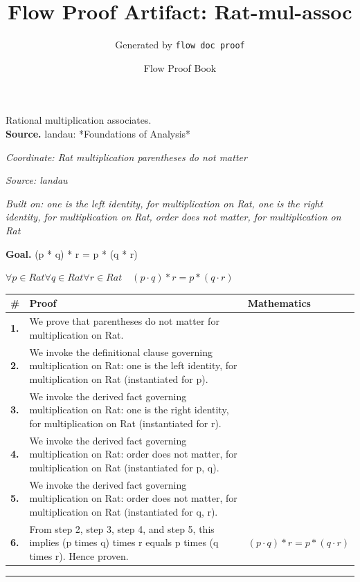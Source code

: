 \documentclass[11pt]{article}
\title{Flow Proof Artifact: Rat-mul-assoc}
\author{Generated by \texttt{flow doc proof}}
\date{Flow Proof Book}
\theoremstyle{definition}
\begin{document}
\maketitle
Rational multiplication associates.\\[0.5em]
\textbf{Source.} landau: *Foundations of Analysis*\\[0.5em]
\bigskip
{}\par
\smallskip\noindent\textit{Coordinate: Rat \cdot multiplication \cdot parentheses do not matter}\par
\smallskip\noindent\textit{Source: landau}\par
\smallskip\noindent\textit{Built on: one is the left identity, for multiplication on Rat, one is the right identity, for multiplication on Rat, order does not matter, for multiplication on Rat}\par
\medskip
\noindent\textbf{Goal.} (p * q) * r = p * (q * r)\par
\noindent$\displaystyle \forall p \in Rat \forall q \in Rat \forall r \in Rat\quad (p \cdot q) * r = p * (q \cdot r)$\par
\medskip
\noindent
\begin{tabular}{@{} >{\raggedright\arraybackslash}p{} >{\raggedright\arraybackslash}p{} >{\raggedleft\arraybackslash}p{} @{}}
\textbf{\#} & \textbf{Proof} & \textbf{Mathematics} \\
\midrule
\textbf{1.} & We prove that parentheses do not matter for multiplication on Rat. & \\[0.45em]
\textbf{2.} & We invoke the definitional clause governing multiplication on Rat: one is the left identity, for multiplication on Rat (instantiated for p). & \\[0.45em]
\textbf{3.} & We invoke the derived fact governing multiplication on Rat: one is the right identity, for multiplication on Rat (instantiated for r). & \\[0.45em]
\textbf{4.} & We invoke the derived fact governing multiplication on Rat: order does not matter, for multiplication on Rat (instantiated for p, q). & \\[0.45em]
\textbf{5.} & We invoke the derived fact governing multiplication on Rat: order does not matter, for multiplication on Rat (instantiated for q, r). & \\[0.45em]
\textbf{6.} & From step 2, step 3, step 4, and step 5, this implies (p times q) times r equals p times (q times r). Hence proven. & $\displaystyle (p \cdot q) * r = p * (q \cdot r)$ \\[0.45em]
\bottomrule
\end{tabular}
\label{thm:Rat-multiplication-parentheses_do_not_matter}
\par\medskip\hrule
\end{document}
